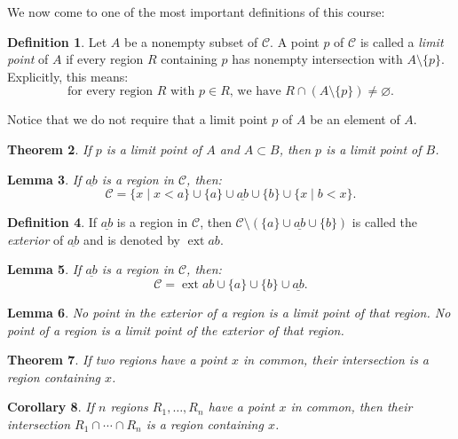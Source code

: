 \documentclass[12pt]{article}
\newcommand{\calC}{\mathcal{C}}
\renewcommand{\_}[1]{\underline{ #1 }}
\DeclareMathOperator{\ext}{ext}
\newtheorem{theorem}{\color{navy}Theorem}[section]
\newtheorem{lemma}[theorem]{\color{purple}Lemma}
\newtheorem{corollary}[theorem]{\color{pink}Corollary}
\theoremstyle{definition}
\newtheorem{definition}[theorem]{\color{forrest}Definition}
\numberwithin{equation}{subsection}
\begin{document}
We now come to one of the most important definitions of this course:

\begin{definition}
Let $A$ be a nonempty subset of $\calC$.  A point $p$ of $\calC$ is called a \emph{limit point} of $A$ if every region $R$ containing $p$ has nonempty intersection with $A \setminus \{p\}$.  Explicitly, this means:
\[
\text{for every region $R$ with $p \in R$, we have $R \cap (A \setminus \{p \}) \neq \varnothing$.}
\]
\end{definition}

Notice that we do not require that a limit point $p$ of $A$ be an element of $A$.

\begin{theorem} If $p$ is a limit point of $A$ and $A \subset B$, then $p$ is a limit point of $B$.
\end{theorem}



\begin{lemma} If $\_{ab}$ is a region in $\calC$, then:
\[
\calC = \{ x \mid x < a \} \cup \{a\} \cup \_{ab} \cup \{b \} \cup \{ x \mid b < x \}.
\]
\end{lemma}

\begin{definition} If $\_{ab}$ is a region in $\calC$, then $\calC \setminus \left(\{a\} \cup \_{ab} \cup \{b\}\right)$ is called the \emph{exterior} of $\_{ab}$ and is denoted by $\ext{ab}$.
\end{definition}

\begin{lemma}  If $\_{ab}$ is a region in $\calC$, then:
\[
\calC = \ext{ab} \cup \{a\} \cup \{b\} \cup \_{ab}.
\]
\end{lemma}

\begin{lemma}  No point in the exterior of a region is a limit point of that region.  No point of a region is a limit point of the exterior of that region.
\end{lemma}


\begin{theorem}  If two regions have a point $x$ in common, their intersection is a region containing $x$.
\end{theorem}

\begin{corollary}  If $n$ regions $R_1, \dotsc, R_n$ have a point $x$ in common, then their intersection $R_1 \cap \dotsm \cap R_n$ is a region containing $x$.
\end{corollary}
\end{document}

